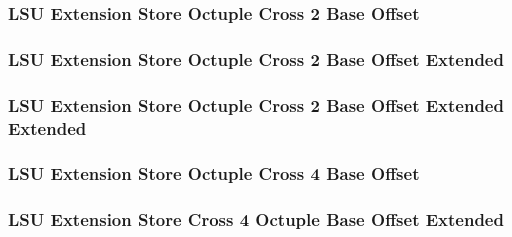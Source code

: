 \subsubsection[{\small LSU Extension Store Octuple Cross 2 Base Offset}]{LSU Extension Store Octuple Cross 2 Base Offset} \label{sec:format-LSU-XSOC2BO}



\subsubsection[{\small LSU Extension Store Octuple Cross 2 Base Offset Extended}]{LSU Extension Store Octuple Cross 2 Base Offset Extended} \label{sec:format-LSU-XSOC2BO.X}



\subsubsection[{\small LSU Extension Store Octuple Cross 2 Base Offset Extended Extended}]{LSU Extension Store Octuple Cross 2 Base Offset Extended Extended} \label{sec:format-LSU-XSOC2BO.Y}



\subsubsection[{\small LSU Extension Store Octuple Cross 4 Base Offset}]{LSU Extension Store Octuple Cross 4 Base Offset} \label{sec:format-LSU-XSOC4BO}



\subsubsection[{\small LSU Extension Store Cross 4 Octuple Base Offset Extended}]{LSU Extension Store Cross 4 Octuple Base Offset Extended} \label{sec:format-LSU-XSOC4BO.X}



